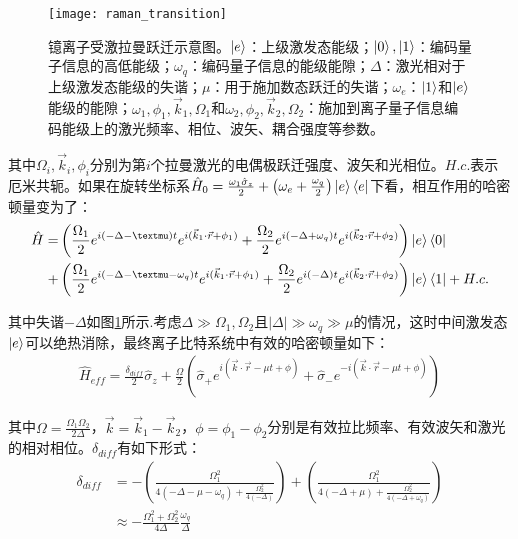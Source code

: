 \begin{figure}
    \centering
    \caption[镱离子受激拉曼跃迁示意图]{镱离子受激拉曼跃迁示意图。$\ket{e}$：上级激发态能级；$\ket{0},\ket{1}$：编码量子信息的高低能级；$\omega_{q}$：编码量子信息的能级能隙；$\Delta$：激光相对于上级激发态能级的失谐；$\mu$：用于施加数态跃迁的失谐；$\omega_e$：$\ket{1}$和$\ket{e}$能级的能隙；$\omega_1,\phi_1,\vec{k}_1, \Omega_1$和$\omega_2,\phi_2,\vec{k}_2, \Omega_2$：施加到离子量子信息编码能级上的激光频率、相位、波矢、耦合强度等参数。\label{fig:raman_transition}}
    \texttt{[image: raman\_transition]}
\end{figure}

其中$\Omega_i,\vec{k}_i, \phi_i$分别为第$i$个拉曼激光的电偶极跃迁强度、波矢和光相位。$H.c.$表示厄米共轭。如果在旋转坐标系$\hat{H}_0=\frac{\omega_1\hat{\sigma}_z}{2}+\left(\omega_e+\frac{\omega_q}{2}\right)\ket{e}\bra{e}$下看，相互作用的哈密顿量变为了：
\begin{align}
    \hat{H}=
    &\left(\frac{\Omega_1}{2}e^{i(-\Delta-\mu)t}e^{i(\vec{k}_1\cdot \vec{r}+\phi_1)}
    +\frac{\Omega_2}{2}e^{i(-\Delta+\omega_q)t}e^{i(\vec{k}_2\cdot \vec{r}+\phi_2)}\right)\ket{e}\bra{0}\\
    +&\left(\frac{\Omega_1}{2}e^{i(-\Delta-\mu-\omega_q)t}e^{i(\vec{k}_1\cdot \vec{r}+\phi_1)}
    +\frac{\Omega_2}{2}e^{i(-\Delta)t}e^{i(\vec{k}_2\cdot \vec{r}+\phi_2)}\right)\ket{e}\bra{1}+H.c.\label{eq:interaction_hamiltonian_yb}
\end{align}

其中失谐$-\Delta$如图\ref{fig:raman_transition}所示.考虑$\Delta\gg\Omega_1,\Omega_2$且$|\Delta|\gg\omega_q\gg\mu$的情况，这时中间激发态$\ket{e}$可以绝热消除，最终离子比特系统中有效的哈密顿量如下：
\begin{align}
    \hat{H}_{eff}=\frac{\delta_{diff}}{2}\hat{\sigma}_z+\frac{\Omega}{2}\left(\hat{\sigma}_+e^{i\left(\vec{k}\cdot\vec{r}-\mu t+\phi\right)}
    +\hat{\sigma}_-e^{-i\left(\vec{k}\cdot\vec{r}-\mu t+\phi\right)}\right)\label{eq:effective_hamiltonian_raman}
\end{align}

其中$\Omega=\frac{\Omega_1\Omega_2}{2\Delta}$，$\vec{k}=\vec{k}_1-\vec{k}_2$，$\phi=\phi_1-\phi_2$分别是有效拉比频率、有效波矢和激光的相对相位。$\delta_{diff}$有如下形式\cite[]{James_Jerke_2007}：
\begin{align}
    \delta_{diff}&=-\left(\frac{\Omega_1^2}{4(-\Delta-\mu-\omega_q)+\frac{\Omega_2^2}{4(-\Delta)}}\right)+\left(\frac{\Omega_1^2}{4(-\Delta+\mu)+\frac{\Omega_2^2}{4(-\Delta+\omega_q)}}\right)\\
    &\approx-\frac{\Omega_1^2+\Omega_2^2}{4\Delta}\frac{\omega_q}{\Delta}
\end{align}

